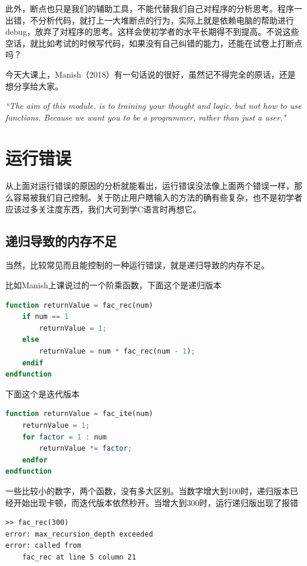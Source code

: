 \documentclass[12pt]{article}
\begin{document}
\begin{spacing}{1.4}
此外，断点也只是我们的辅助工具，不能代替我们自己对程序的分析思考。程序一出错，不分析代码，就打上一大堆断点的行为，实际上就是依赖电脑的帮助进行debug，放弃了对程序的思考。这样会使初学者的水平长期得不到提高。不说这些空话，就比如考试的时候写代码，如果没有自己纠错的能力，还能在试卷上打断点吗？

今天大课上，Manish（2018）有一句话说的很好，虽然记不得完全的原话，还是想分享给大家。

\textit{“The aim of this module, is to training your thought and logic, but not how to use functions. Because we want you to be a programmer, rather than just a user."}

\section{运行错误}

从上面对运行错误的原因的分析就能看出，运行错误没法像上面两个错误一样，那么容易被我们自己控制。关于防止用户瞎输入的方法的确有些复杂，也不是初学者应该过多关注度东西，我们大可到学C语言时再想它。

\subsection{递归导致的内存不足}

当然，比较常见而且能控制的一种运行错误，就是递归导致的内存不足。

比如Manish上课说过的一个阶乘函数，下面这个是递归版本

\begin{lstlisting}[language=octave]
function returnValue = fac_rec(num)
    if num == 1
        returnValue = 1;
    else
        returnValue = num * fac_rec(num - 1);
    endif
endfunction
\end{lstlisting}

下面这个是迭代版本
\begin{lstlisting}[language=octave]
function returnValue = fac_ite(num)
    returnValue = 1;
    for factor = 1 : num
        returnValue *= factor;
    endfor
endfunction
\end{lstlisting}

一些比较小的数字，两个函数，没有多大区别。当数字增大到100时，递归版本已经开始出现卡顿，而迭代版本依然秒开。当增大到300时，运行递归版出现了报错

\begin{lstlisting}
>> fac_rec(300)
error: max_recursion_depth exceeded
error: called from
    fac_rec at line 5 column 21
\end{lstlisting}


\end{spacing}
\end{document}
